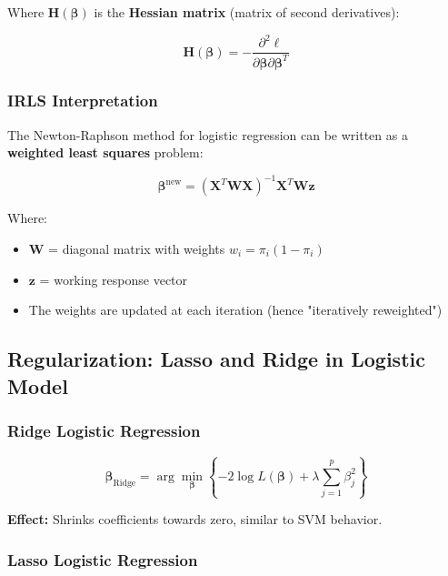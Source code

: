 \documentclass[12pt,a4paper]{article}
\begin{document}
Where $\mathbf{H}(\boldsymbol{\beta})$ is the \textbf{Hessian matrix} (matrix of second derivatives):

\begin{equation}
\mathbf{H}(\boldsymbol{\beta}) = -\frac{\partial^2 \ell}{\partial \boldsymbol{\beta} \partial \boldsymbol{\beta}^T}
\end{equation}

\subsubsection{IRLS Interpretation}

The Newton-Raphson method for logistic regression can be written as a \textbf{weighted least squares} problem:

\begin{equation}
\boldsymbol{\beta}^{\text{new}} = (\mathbf{X}^T\mathbf{W}\mathbf{X})^{-1}\mathbf{X}^T\mathbf{W}\mathbf{z}
\end{equation}

Where:
\begin{itemize}
    \item $\mathbf{W}$ = diagonal matrix with weights $w_i = \pi_i(1-\pi_i)$
    \item $\mathbf{z}$ = working response vector
    \item The weights are updated at each iteration (hence "iteratively reweighted")
\end{itemize}

\subsection{Regularization: Lasso and Ridge in Logistic Model}

\subsubsection{Ridge Logistic Regression}

\begin{equation}
\hat{\boldsymbol{\beta}}_{\text{Ridge}} = \arg\min_{\boldsymbol{\beta}} \left\{ -2 \log L(\boldsymbol{\beta}) + \lambda \sum_{j=1}^p \beta_j^2 \right\}
\end{equation}

\textbf{Effect:} Shrinks coefficients towards zero, similar to SVM behavior.

\subsubsection{Lasso Logistic Regression}
\end{document}
